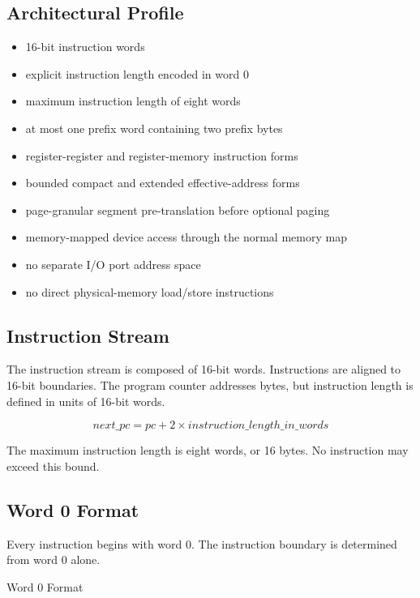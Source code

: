 \subsection{Architectural Profile}
\begin{itemize}
\item 16-bit instruction words
\item explicit instruction length encoded in word 0
\item maximum instruction length of eight words
\item at most one prefix word containing two prefix bytes
\item register-register and register-memory instruction forms
\item bounded compact and extended effective-address forms
\item page-granular segment pre-translation before optional paging
\item memory-mapped device access through the normal memory map
\item no separate I/O port address space
\item no direct physical-memory load/store instructions
\end{itemize}

\subsection{Instruction Stream}
The instruction stream is composed of 16-bit words. Instructions are aligned to
16-bit boundaries. The program counter addresses bytes, but instruction length
is defined in units of 16-bit words.

\[
\mathit{next\_pc} = \mathit{pc} + 2 \times \mathit{instruction\_length\_in\_words}
\]

The maximum instruction length is eight words, or 16 bytes. No instruction may
exceed this bound.

\subsection{Word 0 Format}
Every instruction begins with word 0. The instruction boundary is determined
from word 0 alone.

\begin{manuallistedbitdiagram}{Word 0 Format}
\end{manuallistedbitdiagram}


